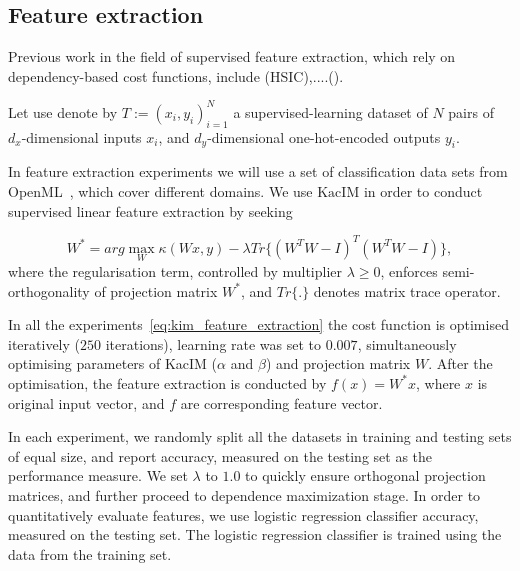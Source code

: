 \documentclass{article}
\newcommand{\KacIM}{\mathrm{KacIM}}
\begin{document}
\subsection{Feature extraction}

Previous work in the field of supervised feature extraction, which rely on dependency-based cost functions, include \cite{EigenHSIC,HSCA,10.1145/1839490.1839495} (HSIC),....().



Let use denote by $T := (x_{i},y_{i})_{i=1}^{N}$ a supervised-learning dataset of $N$ pairs of $d_{x}$-dimensional inputs $x_{i}$, and $d_{y}$-dimensional one-hot-encoded outputs $y_{i}$.

In feature extraction experiments we will use a set of classification data sets from OpenML~\cite{OpenML2013}, which cover different domains.  We use $\KacIM$ in order to conduct supervised linear feature extraction by seeking 

\begin{equation}
\label{eq:kim_feature_extraction}    
W^{*} = arg \max_{W} \kappa(Wx, y) - \lambda Tr\{(W^{T}W-I)^{T}(W^{T}W-I) \},
\end{equation}
where the regularisation term, controlled by multiplier $\lambda \geq 0$, enforces semi-orthogonality of projection matrix $W^{*}$, and $Tr\{.\}$ denotes matrix trace operator.


In all the experiments~\eqref{eq:kim_feature_extraction} the cost function is optimised iteratively ($250$ iterations), learning rate was set to $0.007$, simultaneously optimising parameters of KacIM ($\alpha$ and $\beta$) and projection matrix $W$.
After the optimisation, the feature extraction is conducted by $f(x) = W^{*}x$, where $x$ is original input vector, and $f$ are corresponding feature vector. 



In each experiment, we randomly split all the datasets in training and testing sets of equal size, and report accuracy, measured on the testing set as the performance measure. %
We set $\lambda$ to $1.0$ to quickly ensure orthogonal projection matrices, and further proceed to dependence maximization stage. In order to quantitatively evaluate features, we use logistic regression classifier accuracy, measured on the testing set. The logistic regression classifier is trained using the data from the training set.
\end{document}
